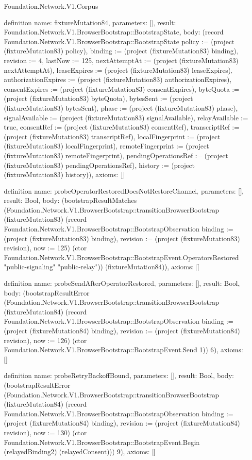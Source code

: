 \begin{lexlean}{Foundation.Network.V1.Corpus}
\begin{semanticmodule}
definition{
  name: fixtureMutation84,
  parameters: [],
  result: Foundation.Network.V1.BrowserBootstrap::BootstrapState,
  body: (record Foundation.Network.V1.BrowserBootstrap::BootstrapState {policy := (project (fixtureMutation83) policy), binding := (project (fixtureMutation83) binding), revision := 4, lastNow := 125, nextAttemptAt := (project (fixtureMutation83) nextAttemptAt), leaseExpires := (project (fixtureMutation83) leaseExpires), authorizationExpires := (project (fixtureMutation83) authorizationExpires), consentExpires := (project (fixtureMutation83) consentExpires), byteQuota := (project (fixtureMutation83) byteQuota), bytesSent := (project (fixtureMutation83) bytesSent), phase := (project (fixtureMutation83) phase), signalAvailable := (project (fixtureMutation83) signalAvailable), relayAvailable := true, consentRef := (project (fixtureMutation83) consentRef), transcriptRef := (project (fixtureMutation83) transcriptRef), localFingerprint := (project (fixtureMutation83) localFingerprint), remoteFingerprint := (project (fixtureMutation83) remoteFingerprint), pendingOperationsRef := (project (fixtureMutation83) pendingOperationsRef), history := (project (fixtureMutation83) history)}),
  axioms: []
}

definition{
  name: probeOperatorRestoredDoesNotRestoreChannel,
  parameters: [],
  result: Bool,
  body: (bootstrapResultMatches (Foundation.Network.V1.BrowserBootstrap::transitionBrowserBootstrap (fixtureMutation83) (record Foundation.Network.V1.BrowserBootstrap::BootstrapObservation {binding := (project (fixtureMutation83) binding), revision := (project (fixtureMutation83) revision), now := 125}) (ctor Foundation.Network.V1.BrowserBootstrap::BootstrapEvent.OperatorsRestored "public-signaling" "public-relay")) (fixtureMutation84)),
  axioms: []
}

definition{
  name: probeSendAfterOperatorRestored,
  parameters: [],
  result: Bool,
  body: (bootstrapResultError (Foundation.Network.V1.BrowserBootstrap::transitionBrowserBootstrap (fixtureMutation84) (record Foundation.Network.V1.BrowserBootstrap::BootstrapObservation {binding := (project (fixtureMutation84) binding), revision := (project (fixtureMutation84) revision), now := 126}) (ctor Foundation.Network.V1.BrowserBootstrap::BootstrapEvent.Send 1)) 6),
  axioms: []
}

definition{
  name: probeRetryBackoffBound,
  parameters: [],
  result: Bool,
  body: (bootstrapResultError (Foundation.Network.V1.BrowserBootstrap::transitionBrowserBootstrap (fixtureMutation84) (record Foundation.Network.V1.BrowserBootstrap::BootstrapObservation {binding := (project (fixtureMutation84) binding), revision := (project (fixtureMutation84) revision), now := 130}) (ctor Foundation.Network.V1.BrowserBootstrap::BootstrapEvent.Begin (relayedBinding2) (relayedConsent))) 9),
  axioms: []
}


\end{semanticmodule}
\end{lexlean}
